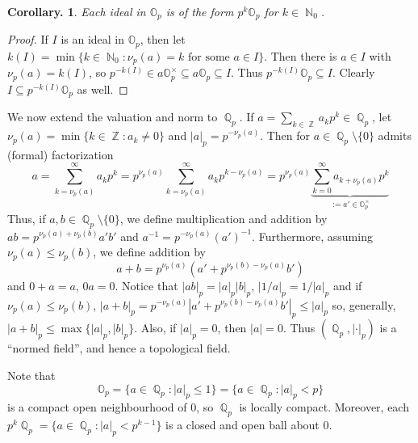 \documentclass[11pt, a4paper]{memoir}
\DeclareMathOperator{\N}{{\mathbb{N}}}
\DeclareMathOperator{\Q}{{\mathbb{Q}}}
\DeclareMathOperator{\Z}{{\mathbb{Z}}}
\theoremstyle{change}
\newtheorem{corollary}[theorem]{Corollary.}
\theoremstyle{plain}
\theoremstyle{nonumberplain}
\newtheorem{proof}{Proof}
\numberwithin{equation}{section}
\begin{document}
\begin{corollary}
    Each ideal in $\mathbb{O}_p$ is of the form $p^k\mathbb{O}_p$ for $k\in\N_0$.
\end{corollary}
\begin{proof}
    If $I$ is an ideal in $\mathbb{O}_p$, then let $k(I)=\min\{k\in\N_0:\nu_p(a)=k\text{ for some }a\in I\}$.
    Then there is $a\in I$ with $\nu_p(a)=k(I)$, so $p^{-k(I)}\in a\mathbb{O}_p^\times\subseteq a\mathbb{O}_p\subseteq I$.
    Thus $p^{-k(I)}\mathbb{O}_p\subseteq I$.
    Clearly $I\subseteq p^{-k(I)}\mathbb{O}_p$ as well.
\end{proof}
We now extend the valuation and norm to $\Q_p$.
If $a=\sum_{k\in\Z}a_kp^k\in\Q_p$, let $\nu_p(a)=\min\{k\in\Z:a_k\neq 0\}$ and $|a|_p=p^{-\nu_p(a)}$.
Then for $a\in\Q_p\setminus\{0\}$ admits (formal) factorization
\begin{equation*}
    a=\sum_{k=\nu_p(a)}^\infty a_kp^k=p^{\nu_p(a)}\sum_{k=\nu_p(a)}^\infty a_kp^{k-\nu_p(a)}=p^{\nu_p(a)}\underbrace{\sum_{k=0}^\infty a_{k+\nu_p(a)}p^k}_{:=a'\in\mathbb{O}_p^\times}
\end{equation*}
Thus, if $a,b\in\Q_p\setminus\{0\}$, we define multiplication and addition by $ab=p^{\nu_p(a)+\nu_p(b)}a'b'$ and $a^{-1}=p^{-\nu_p(a)}(a')^{-1}$.
Furthermore, assuming $\nu_p(a)\leq\nu_p(b)$, we define addition by
\begin{equation*}
    a+b=p^{\nu_p(a)}(a'+p^{\nu_p(b)-\nu_p(a)}b')
\end{equation*}
and $0+a=a$, $0a=0$.
Notice that $|ab|_p=|a|_p|b|_p$, $|1/a|_p=1/|a|_p$ and if $\nu_p(a)\leq \nu_p(b)$, $|a+b|_p=p^{-\nu_p(a)}|a'+p^{\nu_p(b)-\nu_p(a)}b'|_p\leq|a|_p$ so, generally, $|a+b|_p\leq\max\{|a|_p,|b|_p\}$.
Also, if $|a|_p=0$, then $|a|=0$.
Thus $(\Q_p,|\cdot|_p)$ is a ``normed field'', and hence a topological field.

Note that
\begin{equation*}
    \mathbb{O}_p=\{a\in\Q_p:|a|_p\leq 1\}=\{a\in\Q_p:|a|_p<p\}
\end{equation*}
is a compact open neighbourhood of $0$, so $\Q_p$ is locally compact.
Moreover, each $p^k\Q_p=\{a\in\Q_p:|a|_p<p^{k-1}\}$ is a closed and open ball about $0$.
\end{document}
